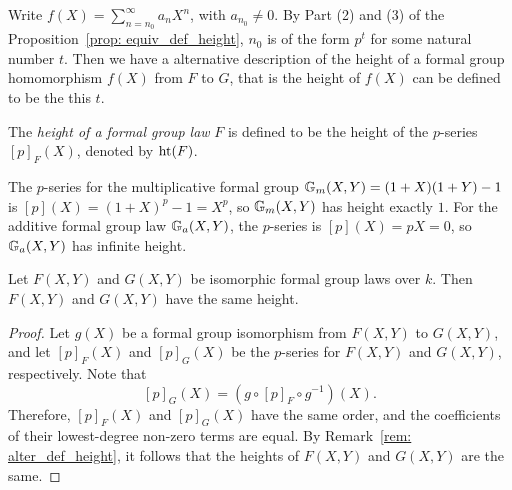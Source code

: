 
\begin{remark}
    Write $f(X) = \sum_{n=n_0}^{\infty} a_n X ^ n$, with $a_{n_0} \neq 0$.
    By Part (2) and (3) of the
    Proposition~\ref{prop: equiv_def_height},
    $n_0$ is of the form $p ^ t$ for some natural number $t$.
    Then we have a alternative description of the height of a formal group
    homomorphism $f(X)$ from $F$ to $G$, that is the height of $f(X)$ can be
    defined to be the this $t$.
    \label{rem: alter_def_height}
\end{remark}

\begin{definition}
    The \emph{height of a formal group law} $F$ is defined to be the height of
    the $p$-series $[p]_F(X)$, denoted by $\mathrm{ht} (F)$.
\end{definition}



\begin{example}
    The $p$-series for the multiplicative formal group
    $\mathbb{G}_m(X,Y) = (1 + X)(1 + Y) - 1$ is $[p](X) = (1 + X)^p - 1 = X ^ p$, so $\mathbb{G}_m(X,Y)$
    has height exactly $1$. For the additive formal group law $\mathbb{G}_a(X,Y)$, the $p$-series is
    $[p](X) = p X = 0$, so $\mathbb{G}_a(X,Y)$ has infinite height.
\end{example}

\begin{proposition}
    Let $F(X,Y)$ and $G(X,Y)$ be isomorphic formal group laws over $k$. Then $F(X,Y)$ and $G(X,Y)$ have
    the same height.
\end{proposition}

\begin{proof}
    Let $g(X)$ be a formal group isomorphism from $F(X, Y)$ to $G(X, Y)$,
    and let $[p]_F(X)$ and $[p]_G(X)$ be the $p$-series for $F(X, Y)$ and $G(X, Y)$,
    respectively. Note that
    \[ [p]_G(X) = (g \circ [p]_F \circ g^{-1})(X). \]
    Therefore, $[p]_F(X)$ and $[p]_G(X)$ have the same order, and the coefficients of
    their lowest-degree non-zero terms are equal. By Remark~\ref{rem: alter_def_height},
    it follows that the heights of $F(X, Y)$ and $G(X, Y)$ are the same.
\end{proof}

